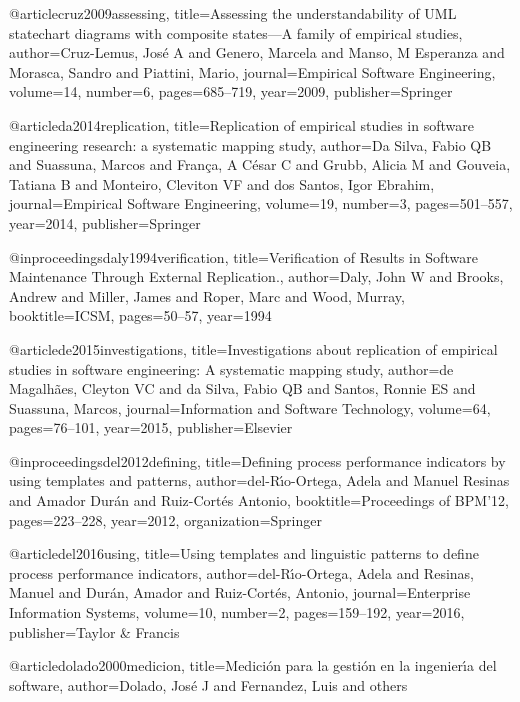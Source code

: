 @article{cruz2009assessing,
  title={Assessing the understandability of UML statechart diagrams with composite states—A family of empirical studies},
  author={Cruz-Lemus, Jos{\'e} A and Genero, Marcela and Manso, M Esperanza and Morasca, Sandro and Piattini, Mario},
  journal={Empirical Software Engineering},
  volume={14},
  number={6},
  pages={685--719},
  year={2009},
  publisher={Springer}
}


@article{da2014replication,
  title={Replication of empirical studies in software engineering research: a systematic mapping study},
  author={Da Silva, Fabio QB and Suassuna, Marcos and Fran{\c{c}}a, A C{\'e}sar C and Grubb, Alicia M and Gouveia, Tatiana B and Monteiro, Cleviton VF and dos Santos, Igor Ebrahim},
  journal={Empirical Software Engineering},
  volume={19},
  number={3},
  pages={501--557},
  year={2014},
  publisher={Springer}
} 

@inproceedings{daly1994verification,
  title={Verification of Results in Software Maintenance Through External Replication.},
  author={Daly, John W and Brooks, Andrew and Miller, James and Roper, Marc and Wood, Murray},
  booktitle={ICSM},
  pages={50--57},
  year={1994}
}

@article{de2015investigations,
  title={Investigations about replication of empirical studies in software engineering: A systematic mapping study},
  author={de Magalh{\~a}es, Cleyton VC and da Silva, Fabio QB and Santos, Ronnie ES and Suassuna, Marcos},
  journal={Information and Software Technology},
  volume={64},
  pages={76--101},
  year={2015},
  publisher={Elsevier}
}



@inproceedings{del2012defining,
  title={Defining process performance indicators by using templates and patterns},
  author={del-R{\'\i}o-Ortega, Adela and Manuel Resinas and Amador Dur{\'a}n and Ruiz-Cort{\'e}s Antonio},
  booktitle={Proceedings of BPM'12},
  pages={223--228},
  year={2012},
  organization={Springer}
}

@article{del2016using,
  title={Using templates and linguistic patterns to define process performance indicators},
  author={del-R{\'\i}o-Ortega, Adela and Resinas, Manuel and Dur{\'a}n, Amador and Ruiz-Cort{\'e}s, Antonio},
  journal={Enterprise Information Systems},
  volume={10},
  number={2},
  pages={159--192},
  year={2016},
  publisher={Taylor \& Francis}
}

@article{dolado2000medicion,
  title={Medici{\'o}n para la gesti{\'o}n en la ingenier{\'\i}a del software},
  author={Dolado, Jos{\'e} J and Fernandez, Luis and others}
}


